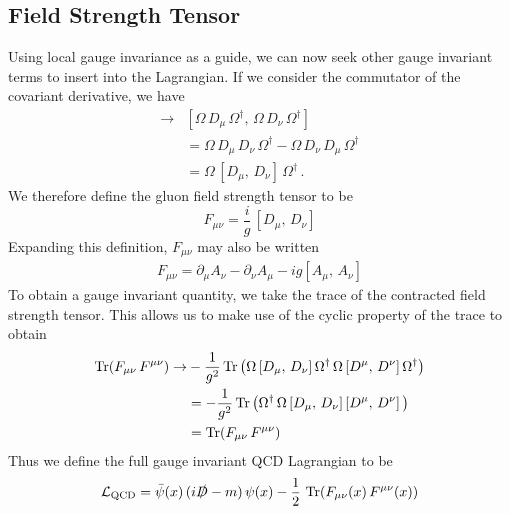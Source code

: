 \subsection{Field Strength Tensor}
Using local gauge invariance as a guide, we can now seek other gauge invariant terms to insert into the Lagrangian. If we consider the commutator of the covariant derivative, we have
%
\begin{align*}
[D_\mu,\, D_\nu]\rightarrow &[\Omega\,D_\mu\,\Omega^\dag,\,\Omega\,D_\nu\,\Omega^\dag]\\
&= \Omega\,D_\mu\, D_\nu\,\Omega^\dag - \Omega\,D_\nu\, D_\mu\,\Omega^\dag\\
&= \Omega\,[D_\mu,\,D_\nu]\,\Omega^\dag\, .
\end{align*}
%
We therefore define the gluon field strength tensor to be
%
\begin{equation}
F_{\mu\nu} = \frac{i}{g}\,[D_\mu,\, D_\nu]
\end{equation}
%
Expanding this definition, $F_{\mu\nu}$ may also be written
%
\begin{align}
F_{\mu\nu}=\partial_\mu A_\nu - \partial_\nu A_\mu - ig[A_\mu,\,A_\nu]
\label{eq:FieldStrengthTensor}
\end{align}
%
To obtain a gauge invariant quantity, we take the trace of the contracted field strength tensor. This allows us to make use of the cyclic property of the trace to obtain
%
\begin{align*}
\operatorname{Tr}(F_{\mu\nu}\,F^{\mu\nu})\rightarrow&-\frac{1}{g^2}\operatorname{Tr}\left(\Omega\,[D_\mu,\,D_\nu]\,\Omega^\dag\,\Omega\,[D^\mu,\,D^\nu]\,\Omega^\dag\right)\\
&=-\frac{1}{g^2}\operatorname{Tr}\left(\Omega^\dag\,\Omega\,[D_\mu,\,D_\nu]\,[D^\mu,\,D^\nu]\,\right)\\
&=\operatorname{Tr}(F_{\mu\nu}\,F^{\mu\nu})
\end{align*}
%
Thus we define the full gauge invariant QCD Lagrangian to be
%
\begin{equation}
\mathcal{L_{\text{QCD}}}=\bar{\psi}(x)\,(i\slashed{D}-m)\,\psi(x)-\frac{1}{2}\,\operatorname{Tr}(F_{\mu\nu}(x)\,F^{\mu\nu}(x))
\label{eq:QCDLagrangian}
\end{equation}\\

